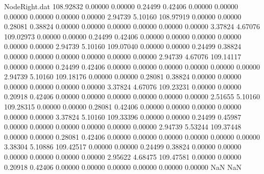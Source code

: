 \begin{filecontents}{NodeRight.dat}
 108.92832    0.00000    0.00000     0.24499    0.42406    0.00000    0.00000    0.00000    0.00000    0.00000    0.00000    2.94739    5.10160
 108.97919    0.00000    0.00000     0.28081    0.38824    0.00000    0.00000    0.00000    0.00000    0.00000    0.00000    3.37824    4.67076
 109.02973    0.00000    0.00000     0.24499    0.42406    0.00000    0.00000    0.00000    0.00000    0.00000    0.00000    2.94739    5.10160
 109.07040    0.00000    0.00000     0.24499    0.38824    0.00000    0.00000    0.00000    0.00000    0.00000    0.00000    2.94739    4.67076
 109.14117    0.00000    0.00000     0.24499    0.42406    0.00000    0.00000    0.00000    0.00000    0.00000    0.00000    2.94739    5.10160
 109.18176    0.00000    0.00000     0.28081    0.38824    0.00000    0.00000    0.00000    0.00000    0.00000    0.00000    3.37824    4.67076
 109.23231    0.00000    0.00000     0.20918    0.42406    0.00000    0.00000    0.00000    0.00000    0.00000    0.00000    2.51655    5.10160
 109.28315    0.00000    0.00000     0.28081    0.42406    0.00000    0.00000    0.00000    0.00000    0.00000    0.00000    3.37824    5.10160
 109.33396    0.00000    0.00000     0.24499    0.45987    0.00000    0.00000    0.00000    0.00000    0.00000    0.00000    2.94739    5.53244
 109.37448    0.00000    0.00000     0.28081    0.42406    0.00000    0.00000    0.00000    0.00000    0.00000    0.00000    3.38304    5.10886
 109.42517    0.00000    0.00000     0.24499    0.38824    0.00000    0.00000    0.00000    0.00000    0.00000    0.00000    2.95622    4.68475
 109.47581    0.00000    0.00000     0.20918    0.42406    0.00000    0.00000    0.00000    0.00000    0.00000    0.00000        NaN        NaN
\end{filecontents}
